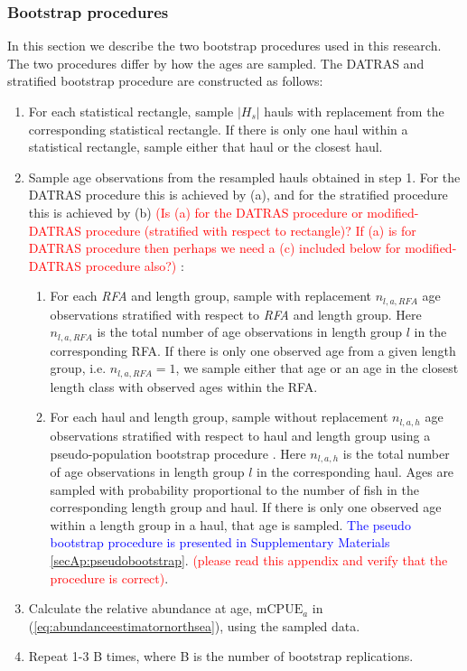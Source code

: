 \documentclass[a4paper 12pt]{article}
\numberwithin{equation}{section}
\newcommand{\ed}[1]{\textcolor{red}{#1}}
\newcommand{\nat}[1]{\textcolor{blue}{#1}}
\begin{document}
\subsubsection{Bootstrap procedures}
\label{sec:datrasstratifiedbootstrap}
In this section we describe the two bootstrap procedures used in this research. The two procedures differ by how the ages are sampled. The DATRAS and stratified bootstrap procedure are constructed as follows:
\begin{enumerate}
\item For each statistical rectangle, sample $|H_s|$ hauls with replacement from the corresponding statistical rectangle. If there is only one haul within a statistical rectangle, sample either that haul or the closest haul.
\item Sample age observations from the resampled hauls obtained in step 1. For the DATRAS procedure this is achieved by (a), and for the stratified procedure this is achieved by (b) \ed{(Is (a) for the DATRAS procedure or modified-DATRAS procedure (stratified with respect to rectangle)? If (a) is for DATRAS procedure then perhaps we need a (c) included below for modified-DATRAS procedure also?)} :
\begin{enumerate}
\item For each \textit{RFA} and length group, sample with replacement $n_{l,a,RFA}$ age observations stratified with respect to \textit{RFA} and length group. Here $n_{l,a,RFA}$ is the total number of age observations in length group $l$ in the corresponding RFA. If there is only one observed age from a given length group, i.e. $n_{l,a,RFA} = 1$, we sample either that age or an age in the closest length class with observed ages within the RFA.
\item For each haul and length group, sample without replacement  $n_{l,a,h}$ age observations stratified with respect to haul and length group using a pseudo-population bootstrap procedure \citep{mashreghi2016survey}. Here $n_{l,a,h}$ is the total number of age observations in length group $l$ in the corresponding haul. Ages are sampled with probability  proportional to the number of fish in the corresponding length group and haul. If there is only one observed age within a length group in a haul, that age is sampled. \nat{The pseudo bootstrap procedure is presented in Supplementary Materials \ref{secAp:pseudobootstrap}}. \ed{(please read this appendix and verify that the procedure is correct)}.
\end{enumerate}
\item Calculate the relative abundance at age, $\text{mCPUE}_a$ in (\ref{eq:abundanceestimatornorthsea}), using the sampled data.
\item Repeat 1-3 B times, where B is the number of bootstrap replications.
\end{enumerate}
\end{document}
